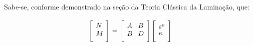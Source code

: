 Sabe-se, conforme demonstrado na seção da Teoria Clássica da Laminação, que:

\begin{equation} \label{ABD_definition}
\begin{gathered}
\begin{bmatrix}
    N \\
    M \\
\end{bmatrix}
=
\begin{bmatrix}
		A & B \\
		B & D \\
\end{bmatrix}
\begin{bmatrix}
    \varepsilon^o \\
    \kappa \\
\end{bmatrix}
\end{gathered}
\end{equation}

